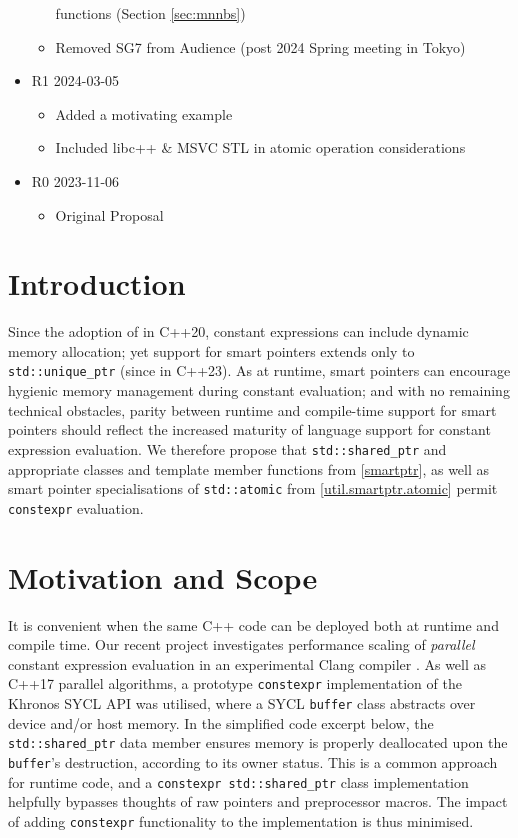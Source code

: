 \documentclass[10pt]{article}
\newcommand*{\wgxxi}[1]{[\href{https://wg21.link/#1}{#1}]}
\begin{document}
\begin{itemize}
\begin{itemize}
        functions (Section \ref{sec:mnnbs})
  \item Removed SG7 from Audience (post 2024 Spring meeting in Tokyo)
  \end{itemize}
\item R1 2024-03-05
  \begin{itemize}
  \item Added a motivating example
  \item Included libc++ \& MSVC STL in atomic operation considerations
  \end{itemize}
\item R0 2023-11-06
  \begin{itemize}
  \item Original Proposal
  \end{itemize}
\end{itemize}

\section{Introduction}

Since the adoption of \cite{P0784R7} in C++20, constant expressions can include
dynamic memory allocation; yet support for smart pointers extends only to
\texttt{std::unique\_ptr} (since \cite{P2273R3} in C++23). As at runtime, smart
pointers can encourage hygienic memory management during constant evaluation;
and with no remaining technical obstacles, parity between runtime and
compile-time support for smart pointers should reflect the increased maturity
of language support for constant expression evaluation.  We therefore propose
that \texttt{std::shared\_ptr} and appropriate classes and template member
functions from \wgxxi{smartptr}, as well as smart pointer specialisations
of \texttt{std::atomic} from \wgxxi{util.smartptr.atomic} permit
\texttt{constexpr} evaluation.

\section{Motivation and Scope}

It is convenient when the same C++ code can be deployed both at runtime and
compile time. Our recent project investigates performance scaling of
\emph{parallel} constant expression evaluation in an experimental Clang
compiler \cite{ClangOz}. As well as C++17 parallel algorithms, a prototype
\texttt{constexpr} implementation of the Khronos SYCL API was utilised, where a
SYCL \texttt{buffer} class abstracts over device and/or host memory. In the
simplified code excerpt below, the \texttt{std::shared\_ptr} data member
ensures memory is properly deallocated upon the \texttt{buffer}'s destruction,
according to its owner status. This is a common approach for runtime code, and
a \texttt{constexpr std::shared\_ptr} class implementation helpfully bypasses
thoughts of raw pointers and preprocessor macros. The impact of adding
\texttt{constexpr} functionality to the implementation is thus
minimised.
\end{document}

